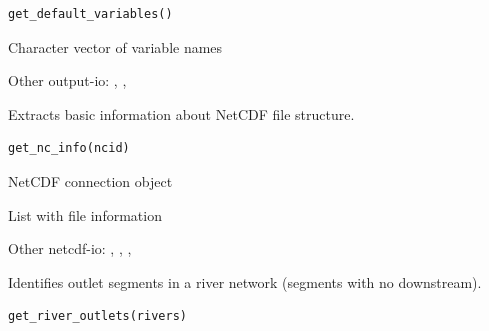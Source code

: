 \documentclass[a4paper]{book}
\begin{document}
%
\begin{Usage}
\begin{verbatim}
get_default_variables()
\end{verbatim}
\end{Usage}
%
\begin{Value}
Character vector of variable names
\end{Value}
%
\begin{SeeAlso}\relax
Other output-io: 
,
,
\end{SeeAlso}
%
\begin{Description}\relax
Extracts basic information about NetCDF file structure.
\end{Description}
%
\begin{Usage}
\begin{verbatim}
get_nc_info(ncid)
\end{verbatim}
\end{Usage}
%
\begin{Arguments}
\begin{ldescription}
\item[\code{ncid}] NetCDF connection object
\end{ldescription}
\end{Arguments}
%
\begin{Value}
List with file information
\end{Value}
%
\begin{SeeAlso}\relax
Other netcdf-io: 
,
,
,
\end{SeeAlso}
%
\begin{Description}\relax
Identifies outlet segments in a river network (segments with no downstream).
\end{Description}
%
\begin{Usage}
\begin{verbatim}
get_river_outlets(rivers)
\end{verbatim}
\end{Usage}
\end{document}
